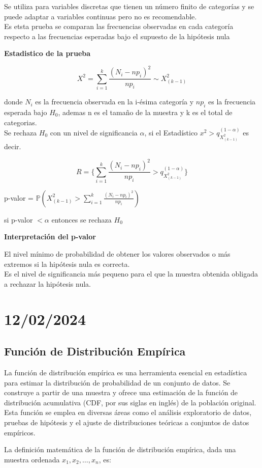\documentclass{article}
\begin{document}
Se utiliza para variables discretas que tienen un número finito de categorías y se puede adaptar a variables continuas pero no es recomendable.\\
Es etsta prueba se comparan las frecuencias observadas en cada categoría respecto a las frecuencias esperadas bajo el supuesto de la hipótesis nula

\textbf{Estadistico de la prueba}

\[X^2 = \sum_{i=1}^{k} \frac{(N_i - np_i)^2}{np_i} \sim X^2_{(k-1)}\]

donde $N_i$ es la frecuencia observada en la i-ésima categoría y $np_i$ es la frecuencia esperada bajo $H_0$, ademas n es el tamaño de la muestra y k es el total de categorias.\\
Se rechaza $H_0$ con un nivel de significancia $\alpha$, si el Estadístico $x^2 > q_{X^2_{(k-1)}}^{(1-\alpha)}$ es decir.

\[R = \{\sum_{i=1}^{k} \frac{(N_i - np_i)^2}{np_i} > q_{X^2_{(k-1)}}^{(1-\alpha)}\}\]

p-valor = $\mathbb{P}(X^2_{(k-1)} > \sum_{i=1}^{k} \frac{(N_i - np_i)^2}{np_i})$

si p-valor $< \alpha$ entonces se rechaza $H_0$

\textbf{Interpretación del p-valor}

El nivel mínimo de probabilidad de obtener los valores observados o más extremos si la hipótesis nula es correcta.\\
Es el nivel de significancia más pequeno para el que la muestra obtenida obligada a rechazar la hipótesis nula.
\newpage
\section{12/02/2024}
\subsection{Función de Distribución Empírica}

La función de distribución empírica es una herramienta esencial en estadística para estimar la distribución de probabilidad de un conjunto de datos. Se construye a partir de una muestra y ofrece una estimación de la función de distribución acumulativa (CDF, por sus siglas en inglés) de la población original. Esta función se emplea en diversas áreas como el análisis exploratorio de datos, pruebas de hipótesis y el ajuste de distribuciones teóricas a conjuntos de datos empíricos.

La definición matemática de la función de distribución empírica, dada una muestra ordenada \(x_1, x_2, \ldots, x_n\), es:
\end{document}
